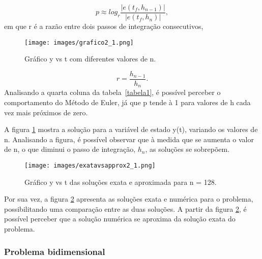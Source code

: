 \documentclass[12pt]{article}
\begin{document}
    \begin{equation}
    p \approx log_r\frac{|e(t_f,h_{n-1})|}{|e(t_f, h_n)|}, 
    \label{ordemp}
    \end{equation}
    \hspace{0.4cm}em que r é a razão entre dois passos de integração consecutivos, 
    
    \begin{figure}[h]
       \texttt{[image: images/grafico2\_1.png]}
       \caption{Gráfico y vs t com diferentes valores de n.}
       \label{grafico2.1}
    \end{figure}
    
    \begin{equation}
    r = \frac{h_{n-1}}{h_n}.
    \end{equation}
    \hspace{0.8cm}Analisando a quarta coluna da tabela~\ref{tabela1}, é possível perceber o comportamento do Método de Euler, já que p tende à 1 para valores de h cada vez mais próximos de zero.

    \hspace{0.2cm}A figura \ref{grafico2.1} mostra a solução para a variável de estado y(t), variando os valores de n. Analisando a figura, é possível observar que à medida que se aumenta o valor de n, o que diminui o passo de integração, \(h_n\), as soluções se sobrepõem. 

     \begin{figure}[h]
       \texttt{[image: images/exatavsapprox2\_1.png]}
       \caption{Gráfico y vs t das soluções exata e aproximada para n = 128.}
       \label{exactvsapprox2.1}
    \end{figure}

    Por sua vez, a figura \ref{exactvsapprox2.1} apresenta as soluções exata e numérica para o problema, possibilitando uma comparação entre as duas soluções. A partir da figura \ref{exactvsapprox2.1}, é possível perceber que a solução numérica se aproxima da solução exata do problema.

            \subsubsection{Problema bidimensional}
\end{document}
